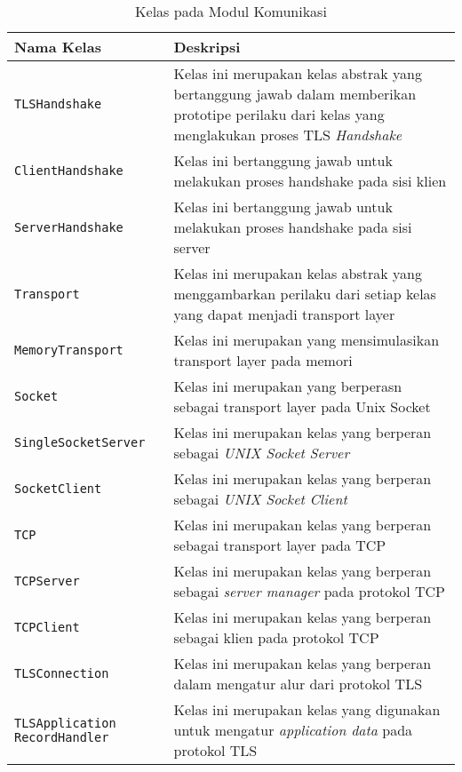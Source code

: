 \begin{longtable}{|p{4cm}|p{8cm}|}
  \caption{Kelas pada Modul Komunikasi} \label{tab:impl.comm} \\

  \hline
    Nama Kelas & Deskripsi \\ \hline
    \endhead

    \texttt{TLSHandshake} & Kelas ini merupakan kelas abstrak yang bertanggung jawab dalam memberikan prototipe perilaku dari kelas yang menglakukan proses TLS \emph{Handshake}\\ \hline
    \texttt{ClientHandshake} & Kelas ini bertanggung jawab untuk melakukan proses handshake pada sisi klien\\ \hline
    \texttt{ServerHandshake} & Kelas ini bertanggung jawab untuk melakukan proses handshake pada sisi server\\ \hline
    \texttt{Transport} & Kelas ini merupakan kelas abstrak yang menggambarkan perilaku dari setiap kelas yang dapat menjadi transport layer\\ \hline
    \texttt{MemoryTransport} & Kelas ini merupakan yang mensimulasikan transport layer pada memori\\ \hline
    \texttt{Socket} & Kelas ini merupakan yang berperasn sebagai transport layer pada Unix Socket\\ \hline
    \texttt{SingleSocketServer} & Kelas ini merupakan kelas yang berperan sebagai \emph{UNIX Socket Server}\\ \hline
    \texttt{SocketClient} & Kelas ini merupakan kelas yang berperan sebagai \emph{UNIX Socket Client}\\ \hline
    \texttt{TCP} & Kelas ini merupakan kelas yang berperan sebagai transport layer pada TCP\\ \hline
    \texttt{TCPServer} & Kelas ini merupakan kelas yang berperan sebagai \emph{server manager} pada protokol TCP\\ \hline
    \texttt{TCPClient} & Kelas ini merupakan kelas yang berperan sebagai klien pada protokol TCP\\ \hline
    \texttt{TLSConnection} & Kelas ini merupakan kelas yang berperan dalam mengatur alur dari protokol TLS\\ \hline
    \texttt{TLSApplication} \texttt{RecordHandler} & Kelas ini merupakan kelas yang digunakan untuk mengatur \emph{application data} pada protokol TLS\\ \hline
\end{longtable}
  


